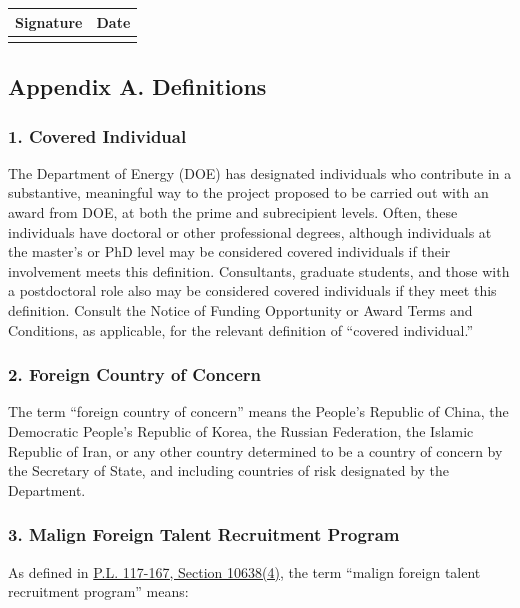 \documentclass[
]{article}
\begin{document}
\begin{longtable}[]{@{}ll@{}}
\toprule\noalign{}
Signature & Date \\
\midrule\noalign{}
\endhead
\bottomrule\noalign{}
\endlastfoot
& \\
\end{longtable}

\subsection{Appendix A. Definitions}\label{appendix-a-definitions}

\subsubsection{1. Covered Individual}\label{1-covered-individual}

The Department of Energy (DOE) has designated individuals who contribute
in a substantive, meaningful way to the project proposed to be carried
out with an award from DOE, at both the prime and subrecipient levels.
Often, these individuals have doctoral or other professional degrees,
although individuals at the master's or PhD level may be considered
covered individuals if their involvement meets this definition.
Consultants, graduate students, and those with a postdoctoral role also
may be considered covered individuals if they meet this definition.
Consult the Notice of Funding Opportunity or Award Terms and Conditions,
as applicable, for the relevant definition of ``covered individual.''

\subsubsection{2. Foreign Country of
Concern}\label{2-foreign-country-of-concern}

The term ``foreign country of concern'' means the People's Republic of
China, the Democratic People's Republic of Korea, the Russian
Federation, the Islamic Republic of Iran, or any other country
determined to be a country of concern by the Secretary of State, and
including countries of risk designated by the Department.

\subsubsection{3. Malign Foreign Talent Recruitment
Program}\label{3-malign-foreign-talent-recruitment-program}

As defined in
\href{https://www.congress.gov/117/plaws/publ167/PLAW-117publ167.pdf\#page=305}{P.L.
117-167, Section 10638(4)}, the term ``malign foreign talent recruitment
program'' means:
\end{document}
